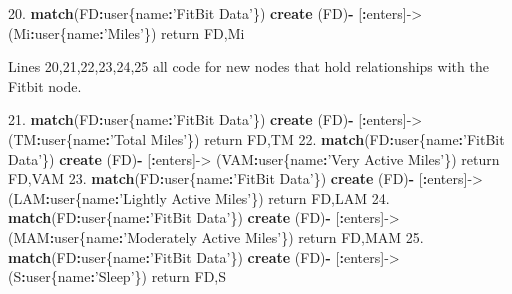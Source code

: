 \documentclass[]{book}
\newenvironment{Shaded}{\begin{snugshade}}{\end{snugshade}}
\newcommand{\KeywordTok}[1]{\textcolor[rgb]{0.13,0.29,0.53}{\textbf{#1}}}
\newcommand{\FloatTok}[1]{\textcolor[rgb]{0.00,0.00,0.81}{#1}}
\newcommand{\StringTok}[1]{\textcolor[rgb]{0.31,0.60,0.02}{#1}}
\newcommand{\OperatorTok}[1]{\textcolor[rgb]{0.81,0.36,0.00}{\textbf{#1}}}
\newcommand{\NormalTok}[1]{#1}
\begin{document}
\begin{Shaded}
\begin{Highlighting}[]
\FloatTok{20.} \KeywordTok{match}\NormalTok{(FD}\OperatorTok{:}\NormalTok{user\{name}\OperatorTok{:}\StringTok{'FitBit Data'}\NormalTok{\}) }\KeywordTok{create}\NormalTok{ (FD)}\OperatorTok{-}\StringTok{ }\NormalTok{[}\OperatorTok{:}\NormalTok{enters]->}\StringTok{ }\NormalTok{(Mi}\OperatorTok{:}\NormalTok{user\{name}\OperatorTok{:}\StringTok{'Miles'}\NormalTok{\}) return FD,Mi}
\end{Highlighting}
\end{Shaded}

Lines 20,21,22,23,24,25 all code for new nodes that hold relationships
with the Fitbit node.

\begin{Shaded}
\begin{Highlighting}[]
\FloatTok{21.} \KeywordTok{match}\NormalTok{(FD}\OperatorTok{:}\NormalTok{user\{name}\OperatorTok{:}\StringTok{'FitBit Data'}\NormalTok{\}) }\KeywordTok{create}\NormalTok{ (FD)}\OperatorTok{-}\StringTok{ }\NormalTok{[}\OperatorTok{:}\NormalTok{enters]->}\StringTok{ }\NormalTok{(TM}\OperatorTok{:}\NormalTok{user\{name}\OperatorTok{:}\StringTok{'Total Miles'}\NormalTok{\}) return FD,TM}
\FloatTok{22.} \KeywordTok{match}\NormalTok{(FD}\OperatorTok{:}\NormalTok{user\{name}\OperatorTok{:}\StringTok{'FitBit Data'}\NormalTok{\}) }\KeywordTok{create}\NormalTok{ (FD)}\OperatorTok{-}\StringTok{ }\NormalTok{[}\OperatorTok{:}\NormalTok{enters]->}\StringTok{ }\NormalTok{(VAM}\OperatorTok{:}\NormalTok{user\{name}\OperatorTok{:}\StringTok{'Very Active Miles'}\NormalTok{\}) return FD,VAM}
\FloatTok{23.} \KeywordTok{match}\NormalTok{(FD}\OperatorTok{:}\NormalTok{user\{name}\OperatorTok{:}\StringTok{'FitBit Data'}\NormalTok{\}) }\KeywordTok{create}\NormalTok{ (FD)}\OperatorTok{-}\StringTok{ }\NormalTok{[}\OperatorTok{:}\NormalTok{enters]->}\StringTok{ }\NormalTok{(LAM}\OperatorTok{:}\NormalTok{user\{name}\OperatorTok{:}\StringTok{'Lightly Active Miles'}\NormalTok{\}) return FD,LAM}
\FloatTok{24.} \KeywordTok{match}\NormalTok{(FD}\OperatorTok{:}\NormalTok{user\{name}\OperatorTok{:}\StringTok{'FitBit Data'}\NormalTok{\}) }\KeywordTok{create}\NormalTok{ (FD)}\OperatorTok{-}\StringTok{ }\NormalTok{[}\OperatorTok{:}\NormalTok{enters]->}\StringTok{ }\NormalTok{(MAM}\OperatorTok{:}\NormalTok{user\{name}\OperatorTok{:}\StringTok{'Moderately Active Miles'}\NormalTok{\}) return FD,MAM}
\FloatTok{25.} \KeywordTok{match}\NormalTok{(FD}\OperatorTok{:}\NormalTok{user\{name}\OperatorTok{:}\StringTok{'FitBit Data'}\NormalTok{\}) }\KeywordTok{create}\NormalTok{ (FD)}\OperatorTok{-}\StringTok{ }\NormalTok{[}\OperatorTok{:}\NormalTok{enters]->}\StringTok{ }\NormalTok{(S}\OperatorTok{:}\NormalTok{user\{name}\OperatorTok{:}\StringTok{'Sleep'}\NormalTok{\}) return FD,S}
\end{Highlighting}
\end{Shaded}
\end{document}
